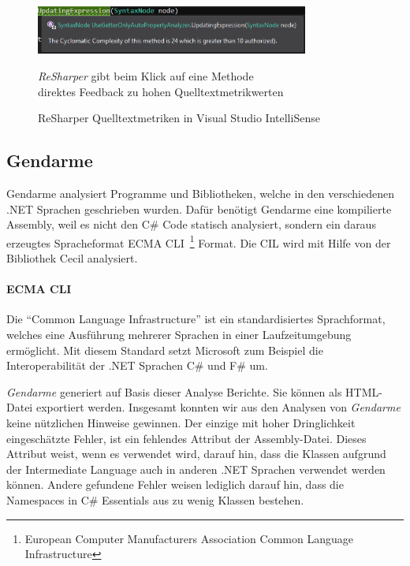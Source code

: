 \begin{figure}[!ht]
	\centering
	\includegraphics[width=0.8\textwidth]{images/rsharper-code-metric-inline.png}
	\caption{ReSharper Quelltextmetriken in Visual Studio IntelliSense}
	\vspace{0.1cm}
	\emph{ReSharper} gibt beim Klick auf eine Methode \\
	direktes Feedback zu hohen Quelltextmetrikwerten 
	\label{fig:rsharper-code-metric-inline}
\end{figure}

\subsection{Gendarme}
\label{sec:gendarme}
Gendarme analysiert Programme und Bibliotheken, welche in den verschiedenen .NET Sprachen geschrieben wurden. Dafür benötigt Gendarme eine kompilierte Assembly, weil es nicht den C\# Code statisch analysiert, sondern ein daraus erzeugtes Spracheformat ECMA CLI~\footnote{European Computer Manufacturers Association Common Language Infrastructure} Format. Die CIL wird mit Hilfe von der Bibliothek Cecil analysiert.~\cite{cecil}
 
\paragraph{ECMA CLI} Die \enquote{Common Language Infrastructure} ist ein standardisiertes Sprachformat, welches eine Ausführung mehrerer Sprachen in einer Laufzeitumgebung ermöglicht. Mit diesem Standard setzt Microsoft zum Beispiel die Interoperabilität der .NET Sprachen C\# und F\# um. ~\cite{ecma}

\vspace{0.2cm}

\emph{Gendarme} generiert auf Basis dieser Analyse Berichte. Sie können als HTML-Datei exportiert werden. Insgesamt konnten wir aus den Analysen von \emph{Gendarme} keine nützlichen Hinweise gewinnen. Der einzige mit hoher Dringlichkeit eingeschätzte Fehler, ist ein fehlendes Attribut der Assembly-Datei. Dieses Attribut weist, wenn es verwendet wird, darauf hin, dass die Klassen aufgrund der Intermediate Language auch in anderen .NET Sprachen verwendet werden können. Andere gefundene Fehler weisen lediglich darauf hin, dass die Namespaces in C\# Essentials aus zu wenig Klassen bestehen. 

